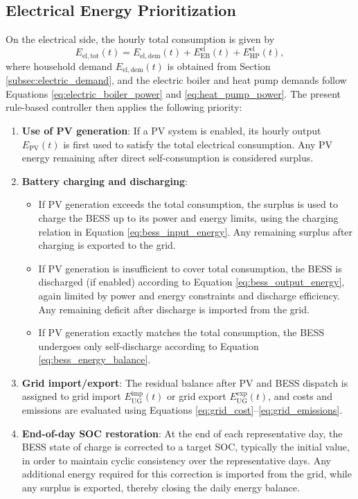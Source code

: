 \documentclass[12pt,a4paper]{report}
\begin{document}
\subsection{Electrical Energy Prioritization}
\label{subsec:electrical_prioritisation}

On the electrical side, the hourly total consumption is given by
\begin{equation}
E_{\mathrm{el,tot}}(t) = E_{\mathrm{el,dem}}(t)
+ E_{\mathrm{EB}}^{\mathrm{el}}(t)
+ E_{\mathrm{HP}}^{\mathrm{el}}(t),
\label{eq:total_electric_consumption}
\end{equation}
where household demand \(E_{\mathrm{el,dem}}(t)\) is obtained from Section \ref{subsec:electric_demand}, and the electric boiler and heat pump demands follow Equations \ref{eq:electric_boiler_power} and \ref{eq:heat_pump_power}. The present rule-based controller then applies the following priority:
\begin{enumerate}
    \item \textbf{Use of PV generation}: If a PV system is enabled, its hourly output \(E_{\mathrm{PV}}(t)\) is first used to satisfy the total electrical consumption. Any PV energy remaining after direct self-consumption is considered surplus.
    \item \textbf{Battery charging and discharging}:
    \begin{itemize}
        \item If PV generation exceeds the total consumption, the surplus is used to charge the BESS up to its power and energy limits, using the charging relation in Equation \ref{eq:bess_input_energy}. Any remaining surplus after charging is exported to the grid.
        \item If PV generation is insufficient to cover total consumption, the BESS is discharged (if enabled) according to Equation \ref{eq:bess_output_energy}, again limited by power and energy constraints and discharge efficiency. Any remaining deficit after discharge is imported from the grid.
        \item If PV generation exactly matches the total consumption, the BESS undergoes only self-discharge according to Equation \ref{eq:bess_energy_balance}.
    \end{itemize}
    \item \textbf{Grid import/export}: The residual balance after PV and BESS dispatch is assigned to grid import \(E_{\mathrm{UG}}^{\mathrm{imp}}(t)\) or grid export \(E_{\mathrm{UG}}^{\mathrm{exp}}(t)\), and costs and emissions are evaluated using Equations \ref{eq:grid_cost}--\ref{eq:grid_emissions}.
    \item \textbf{End-of-day SOC restoration}: At the end of each representative day, the BESS state of charge is corrected to a target SOC, typically the initial value, in order to maintain cyclic consistency over the representative days. Any additional energy required for this correction is imported from the grid, while any surplus is exported, thereby closing the daily energy balance.
\end{enumerate}
\end{document}
